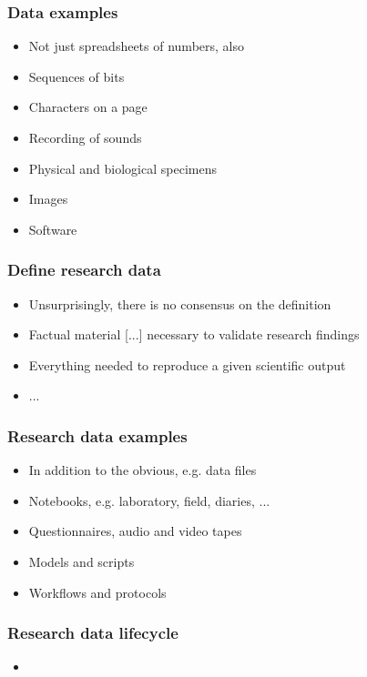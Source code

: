 \documentclass{beamer}
\begin{document}
\begin{frame}
  \frametitle{Data examples}
  
  \begin{itemize}
  \item Not just spreadsheets of numbers, also
  \item Sequences of bits
  \item Characters on a page
  \item Recording of sounds
  \item Physical and biological specimens
  \item Images
  \item Software
  \end{itemize}
\end{frame}

\begin{frame}
  \frametitle{Define research data}
  
  \begin{itemize}
  \item Unsurprisingly, there is no consensus on the definition
  \item Factual material [...] necessary to validate research findings \cite{epsrc17researchdata}
  \item Everything needed to reproduce a given scientific output \cite{surkis15researchdata}
  \item ...
  \end{itemize}
\end{frame}

\begin{frame}
  \frametitle{Research data examples}
  
  \begin{itemize}
  \item In addition to the obvious, e.g. data files
  \item Notebooks, e.g. laboratory, field, diaries, ...
  \item Questionnaires, audio and video tapes
  \item Models and scripts
  \item Workflows and protocols
  \end{itemize}
\end{frame}

\begin{frame}
  \frametitle{Research data lifecycle}
  
  \begin{itemize}
  \item 
  \end{itemize}
\end{frame}
\end{document}
